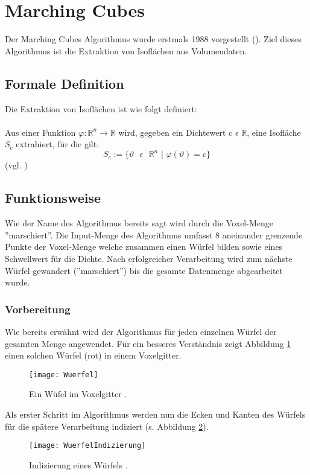 \section{Marching Cubes}
Der Marching Cubes Algorithmus wurde erstmals 1988 vorgestellt (\cite{MCAlgo}). Ziel dieses Algorithmus ist die Extraktion von Isoflächen aus Volumendaten. 
\subsection{Formale Definition}
Die Extraktion von Isoflächen ist wie folgt definiert: 
\\\\
Aus einer Funktion $\varphi : \mathbb{R}^{n} \rightarrow \mathbb{R }$ wird, gegeben ein Dichtewert   c $\epsilon$ $ \mathbb{ R} $, eine
Isofläche $S_{c}$ extrahiert, für die gilt:
\begin{equation}
S_{c} := \{ \vartheta \text{ } \epsilon \text{ } \mathbb{R}^{n} \text{ | } \varphi(\vartheta) = c\}
\end{equation} 
(vgl. \cite{SeibtBak})

\subsection{Funktionsweise}
Wie der Name des Algorithmus bereits sagt wird durch die Voxel-Menge ''marschiert''. Die Input-Menge des Algorithmus umfasst 8 aneinander grenzende Punkte der Voxel-Menge welche zusammen einen Würfel bilden sowie eines Schwellwert für die Dichte. Nach erfolgreicher Verarbeitung wird zum nächste Würfel gewandert (''marschiert'') bis die gesamte Datenmenge abgearbeitet wurde. 
\subsubsection{Vorbereitung}
Wie bereits erwähnt wird der Algorithmus für jeden einzelnen Würfel der gesamten Menge angewendet. Für ein besseres Verständnis zeigt Abbildung \ref{fig:Wuerfel} einen solchen Würfel (rot) in einem Voxelgitter.
\begin{figure}[H]
	\centering
	\texttt{[image: Wuerfel]}
	\caption{Ein Wüfel im Voxelgitter \cite{SeibtBak}.}
	\label{fig:Wuerfel}
\end{figure}
Als erster Schritt im Algorithmus werden nun die Ecken und Kanten des Würfels für die spätere Verarbeitung indiziert (s. Abbildung \ref{fig:WuerfelIndizierung}).
\begin{figure}[H]
	\centering
	\texttt{[image: WuerfelIndizierung]}
	\caption{Indizierung eines Würfels \cite{SeibtBak}.}
	\label{fig:WuerfelIndizierung}
\end{figure}


